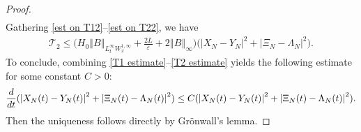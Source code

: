 \documentclass[10pt,a4paper]{amsart}
\def\dd{{\rm d}}
\begin{document}
\begin{proof}
\begin{align}
\end{align}
Gathering \eqref{est on T12}--\eqref{est on T22}, we have
\begin{align}
\mathcal{T}_{2}
\leq \big(H_{0}\left\Vert B\right\Vert_{L^{\infty}_{t}W^{1,\infty}_{x}}+\frac{2L}{\varepsilon}+2\left\Vert B\right\Vert_{\infty}\big)\big(\left\vert X_{N}-Y_{N}\right\vert^{2}+\left\vert \Xi_{N}-\Lambda_{N}\right\vert^{2}\big). \label{T2 estimate}  
\end{align}
To conclude, combining \eqref{T1 estimate}--\eqref{T2 estimate}  yields the following estimate 
for some constant $C>0$: 
\begin{align*}
\frac{\dd}{\dd t}(\left\vert X_{N}(t)-Y_{N}(t)\right\vert^{2}+\left\vert \Xi_{N}(t)-\Lambda_{N}(t)\right\vert^{2})\leq C(\left\vert X_{N}(t)-Y_{N}(t)\right\vert^{2} +\left\vert \Xi_{N}(t)-\Lambda_{N}(t)\right\vert^{2} ).     
\end{align*}
Then the uniqueness follows directly by Gr\"onwall's lemma. 
\end{proof}
\end{document}
